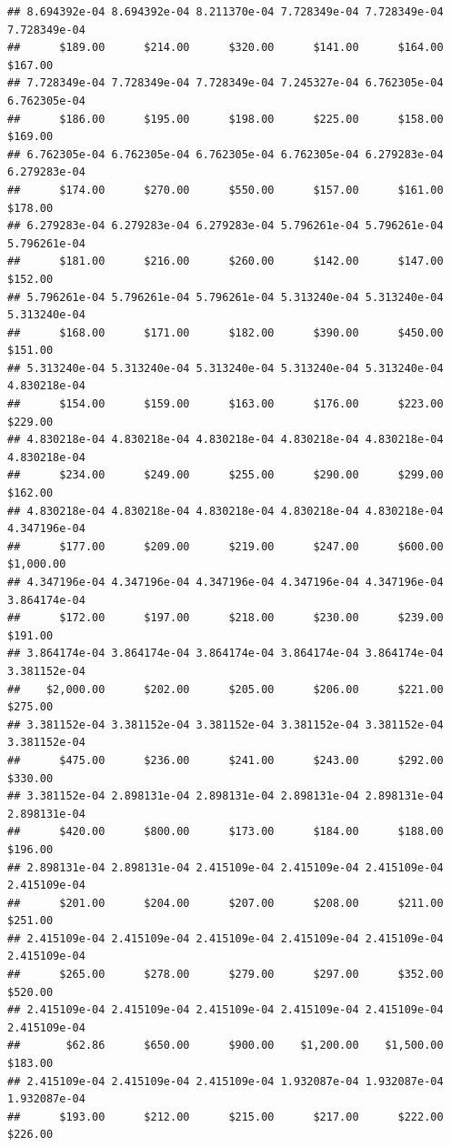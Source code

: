 \begin{verbatim}
## 8.694392e-04 8.694392e-04 8.211370e-04 7.728349e-04 7.728349e-04 7.728349e-04 
##      $189.00      $214.00      $320.00      $141.00      $164.00      $167.00 
## 7.728349e-04 7.728349e-04 7.728349e-04 7.245327e-04 6.762305e-04 6.762305e-04 
##      $186.00      $195.00      $198.00      $225.00      $158.00      $169.00 
## 6.762305e-04 6.762305e-04 6.762305e-04 6.762305e-04 6.279283e-04 6.279283e-04 
##      $174.00      $270.00      $550.00      $157.00      $161.00      $178.00 
## 6.279283e-04 6.279283e-04 6.279283e-04 5.796261e-04 5.796261e-04 5.796261e-04 
##      $181.00      $216.00      $260.00      $142.00      $147.00      $152.00 
## 5.796261e-04 5.796261e-04 5.796261e-04 5.313240e-04 5.313240e-04 5.313240e-04 
##      $168.00      $171.00      $182.00      $390.00      $450.00      $151.00 
## 5.313240e-04 5.313240e-04 5.313240e-04 5.313240e-04 5.313240e-04 4.830218e-04 
##      $154.00      $159.00      $163.00      $176.00      $223.00      $229.00 
## 4.830218e-04 4.830218e-04 4.830218e-04 4.830218e-04 4.830218e-04 4.830218e-04 
##      $234.00      $249.00      $255.00      $290.00      $299.00      $162.00 
## 4.830218e-04 4.830218e-04 4.830218e-04 4.830218e-04 4.830218e-04 4.347196e-04 
##      $177.00      $209.00      $219.00      $247.00      $600.00    $1,000.00 
## 4.347196e-04 4.347196e-04 4.347196e-04 4.347196e-04 4.347196e-04 3.864174e-04 
##      $172.00      $197.00      $218.00      $230.00      $239.00      $191.00 
## 3.864174e-04 3.864174e-04 3.864174e-04 3.864174e-04 3.864174e-04 3.381152e-04 
##    $2,000.00      $202.00      $205.00      $206.00      $221.00      $275.00 
## 3.381152e-04 3.381152e-04 3.381152e-04 3.381152e-04 3.381152e-04 3.381152e-04 
##      $475.00      $236.00      $241.00      $243.00      $292.00      $330.00 
## 3.381152e-04 2.898131e-04 2.898131e-04 2.898131e-04 2.898131e-04 2.898131e-04 
##      $420.00      $800.00      $173.00      $184.00      $188.00      $196.00 
## 2.898131e-04 2.898131e-04 2.415109e-04 2.415109e-04 2.415109e-04 2.415109e-04 
##      $201.00      $204.00      $207.00      $208.00      $211.00      $251.00 
## 2.415109e-04 2.415109e-04 2.415109e-04 2.415109e-04 2.415109e-04 2.415109e-04 
##      $265.00      $278.00      $279.00      $297.00      $352.00      $520.00 
## 2.415109e-04 2.415109e-04 2.415109e-04 2.415109e-04 2.415109e-04 2.415109e-04 
##       $62.86      $650.00      $900.00    $1,200.00    $1,500.00      $183.00 
## 2.415109e-04 2.415109e-04 2.415109e-04 1.932087e-04 1.932087e-04 1.932087e-04 
##      $193.00      $212.00      $215.00      $217.00      $222.00      $226.00 

\end{verbatim}
